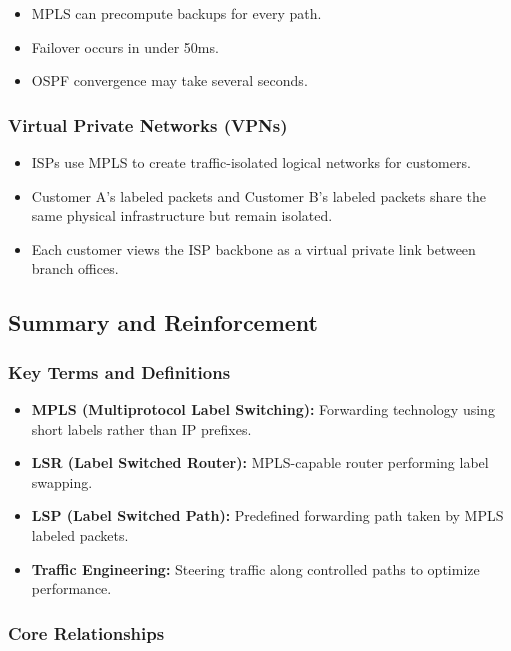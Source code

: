 \documentclass[12pt]{article}
\begin{document}
\begin{itemize}
    \item MPLS can precompute backups for every path.
    \item Failover occurs in under 50ms.
    \item OSPF convergence may take several seconds.
\end{itemize}

\subsubsection{Virtual Private Networks (VPNs)}

\begin{itemize}
    \item ISPs use MPLS to create traffic-isolated logical networks for customers.
    \item Customer A’s labeled packets and Customer B’s labeled packets share the same physical infrastructure but remain isolated.
    \item Each customer views the ISP backbone as a virtual private link between branch offices.
\end{itemize}

\subsection{Summary and Reinforcement}

\subsubsection{Key Terms and Definitions}

\begin{itemize}
    \item \textbf{MPLS (Multiprotocol Label Switching):}
          Forwarding technology using short labels rather than IP prefixes.
    \item \textbf{LSR (Label Switched Router):}
          MPLS-capable router performing label swapping.
    \item \textbf{LSP (Label Switched Path):}
          Predefined forwarding path taken by MPLS labeled packets.
    \item \textbf{Traffic Engineering:}
          Steering traffic along controlled paths to optimize performance.
\end{itemize}

\subsubsection{Core Relationships}
\end{document}
